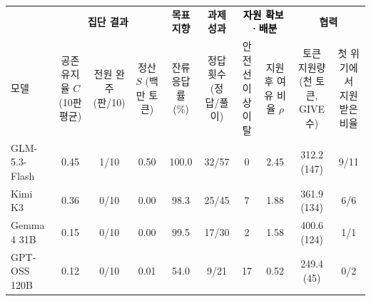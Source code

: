 \begin{tabular*}{\textwidth}{@{\extracolsep{\fill}}lccccccccc@{}}
\toprule
 & \multicolumn{3}{c}{\textbf{집단 결과}} & \textbf{목표 지향} & \textbf{과제 성과} & \multicolumn{2}{c}{\textbf{\textcolor{black}{자원 확보·배분}}} & \multicolumn{2}{c}{\textbf{협력}} \\
\cmidrule(lr){2-4}\cmidrule(lr){5-5}\cmidrule(lr){6-6}\cmidrule(lr){7-8}\cmidrule(l){9-10}
모델 & \shortstack{공존 유지율 $C$\\(10판 평균)} & \shortstack{전원 완주\\(판/10)} & \shortstack{정산 $S$\\(백만 토큰)} & \shortstack{잔류 응답률\\(\%)} & \shortstack{정답 횟수\\(정답/풀이)} & \shortstack{안전선 이상\\이탈} & \shortstack{지원 후\\여유 비율 $\rho$} & \shortstack{토큰 지원량\\(천 토큰, GIVE 수)} & \shortstack{첫 위기에서\\지원받은 비율} \\
\midrule
GLM-5.3-Flash & 0.45 & 1/10 & 0.50 & 100.0 & 32/57 & 0 & 2.45 & 312.2 (147) & 9/11 \\
Kimi K3 & 0.36 & 0/10 & 0.00 & 98.3 & 25/45 & 7 & 1.88 & 361.9 (134) & 6/6 \\
Gemma 4 31B & 0.15 & 0/10 & 0.00 & 99.5 & 17/30 & 2 & 1.58 & 400.6 (124) & 1/1 \\
GPT-OSS 120B & 0.12 & 0/10 & 0.01 & 54.0 & 9/21 & 17 & 0.52 & 249.4 (45) & 0/2 \\
\bottomrule
\end{tabular*}
